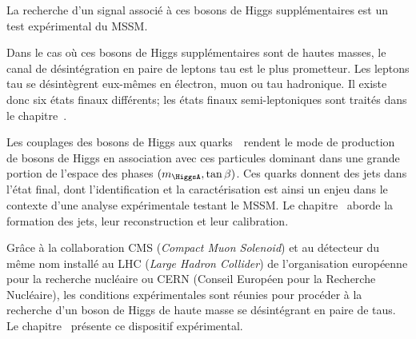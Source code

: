 La recherche d'un signal associé à ces bosons de Higgs supplémentaires est un test expérimental du MSSM.
\par Dans le cas où ces bosons de Higgs supplémentaires sont de hautes masses, le canal de désintégration en paire de leptons tau est le plus prometteur.
Les leptons tau se désintègrent eux-mêmes en électron, muon ou tau hadronique.
Il existe donc six états finaux différents; les états finaux semi-leptoniques sont traités dans le chapitre~.
\par Les couplages des bosons de Higgs aux quarks~\quarkb\ rendent le mode de production de bosons de Higgs en association avec ces particules dominant dans une grande portion de l'espace des phases $(m_{\HiggsA}, \tan\beta)$.
Ces quarks donnent des jets dans l'état final, dont l'identification et la caractérisation est ainsi un enjeu dans le contexte d'une analyse expérimentale testant le MSSM.
Le chapitre~ aborde la formation des jets, leur reconstruction et leur calibration.
\par Grâce à la collaboration CMS (\emph{Compact Muon Solenoid}) et au détecteur du même nom installé au LHC (\emph{Large Hadron Collider}) de l'organisation européenne pour la recherche nucléaire ou CERN (Conseil Européen pour la Recherche Nucléaire), les conditions expérimentales sont réunies pour procéder à la
recherche d'un boson de Higgs de haute masse se désintégrant en paire de taus.
Le chapitre~ présente ce dispositif expérimental.